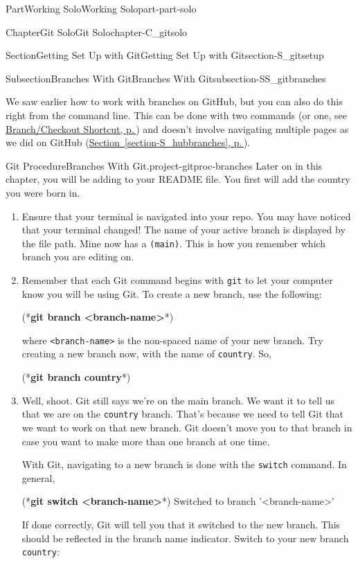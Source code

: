 \documentclass[twoside,10pt,]{book}
\newcommand{\xreffont}{\relax}
\newcommand{\mono}[1]{\texttt{#1}}
\newcommand{\consoleinput}[1]{\textbf{#1}}
\begin{document}
\begin{partptx}{Part}{Working Solo}{}{Working Solo}{}{}{part-part-solo}
\begin{chapterptx}{Chapter}{Git Solo}{}{Git Solo}{}{}{chapter-C_gitsolo}
\begin{sectionptx}{Section}{Getting Set Up with Git}{}{Getting Set Up with Git}{}{}{section-S_gitsetup}
\begin{subsectionptx}{Subsection}{Branches With Git}{}{Branches With Git}{}{}{subsection-SS_gitbranches}
\par
We saw earlier how to work with branches on GitHub, but you can also do this right from the command line. This can be done with two commands (or one, see \hyperlink{paragraphs-branch-shortcut}{Branch\slash{}Checkout Shortcut, p.\,\pageref{paragraphs-branch-shortcut}}) and doesn't involve navigating multiple pages as we did on GitHub (\hyperref[section-S_hubbranches]{Section~{\xreffont\ref{section-S_hubbranches}}, p.\,\pageref{section-S_hubbranches}}).%
\begin{project}{Git Procedure}{Branches With Git.}{project-gitproc-branches}%
%
%
%
Later on in this chapter, you will be adding to your README file. You first will add the country you were born in.%
\begin{enumerate}[font=\bfseries,label=(\alph*),ref=\alph*]%
\item{}Ensure that your terminal is navigated into your repo. You may have noticed that your terminal changed! The name of your active branch is displayed by the file path. Mine now has a \mono{(main)}. This is how you remember which branch you are editing on.%
\item{}Remember that each Git command begins with \mono{git} to let your computer know you will be using Git. To create a new branch, use the following:%
\begin{console}{0}{1}{0}
(*\consoleinput{git branch <branch-name>}*)
\end{console}
where \mono{<branch-name>} is the non-spaced name of your new branch. Try creating a new branch now, with the name of \mono{country}. So,%
\begin{console}{0}{1}{0}
(*\consoleinput{git branch country}*)
\end{console}
\item{}Well, shoot. Git still says we're on the main branch. We want it to tell us that we are on the \mono{country} branch. That's because we need to tell Git that we want to work on that new branch. Git doesn't move you to that branch in case you want to make more than one branch at one time.%
\par
With Git, navigating to a new branch is done with the \mono{switch} command. In general,%
\begin{console}{0}{1}{0}
(*\consoleinput{git switch <branch-name>}*)
Switched to branch '<branch-name>'
\end{console}
If done correctly, Git will tell you that it switched to the new branch. This should be reflected in the branch name indicator. Switch to your new branch \mono{country}:%

\end{enumerate}
\end{project}
\end{subsectionptx}
\end{sectionptx}
\end{chapterptx}
\end{partptx}
\end{document}

